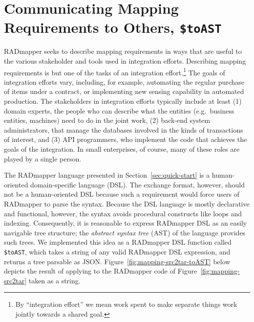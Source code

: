\documentclass[10pt,letterpaper]{article} %
\newcommand{\stt}[1]{\texttt{#1}} %
\begin{document}
\section{Communicating Mapping Requirements to Others, \stt{\$toAST}}
\label{sec:toAST}

RADmapper seeks to describe mapping requirements in ways that are useful to the various stakeholder and tools used in integration efforts.
Describing mapping requirements is but one of the tasks of an integration effort.\footnote{By ``integration effort'' we mean work spent to make separate things work jointly towards a shared goal.}
The goals of integration efforts vary, including, for example, automating the regular purchase of items under a contract, or implementing new sensing capability in automated production.
The stakeholders in integration efforts typically include at least
(1) domain experts, the people who can describe what the entities (e.g.~business entities, machines) need to do in the joint work,
(2) back-end system administrators, that manage the databases involved in the kinds of transactions of interest, and
(3) API programmers, who implement the code that achieves the goals of the integration.
In small enterprises, of course, many of these roles are played by a single person.

The RADmapper language presented in Section~\ref{sec:quick-start} is a human-oriented domain-specific language (DSL).
The exchange format, however, should not be a human-oriented DSL because such a requirement would force users of RADmapper to parse the syntax.
Because the DSL language is mostly declarative and functional, however, the syntax avoids procedural constructs like loops and indexing.
Consequently, it is reasonable to express RADmapper DSL as an easily navigable tree structure;
the \textit{abstract syntax tree} (AST) of the language provides such trees.
We implemented this idea as a RADmapper DSL function called \stt{\$toAST}, which takes a string of any valid RADmapper DSL expression, and returns a tree parsable as JSON.
Figure~\ref{fig:mapping-src2tar-toAST} below depicts the result of applying to the RADmapper code of Figure~\ref{fig:mapping-src2tar} taken as a string.
\end{document}
